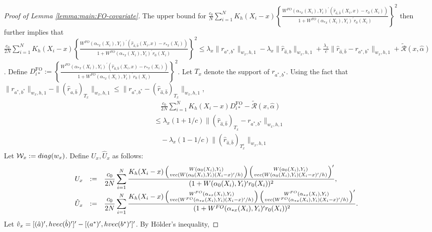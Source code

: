 \documentclass[10pt,a4paper]{amsart}
\begin{document}
\begin{proof}[Proof of Lemma \ref{lemma:main:FO-covariate}]
The upper bound for $\frac{c_0}{N}\sum_{i=1}^NK_h(X_i-x)\left\{\frac{W^{FO}(\alpha_{*x}(X_i),Y_i)^\prime(\hat{r}_{\hat a,\hat b}(X_i,x)-r_0(X_i))}{1+W^{FO}(\alpha_{*x}(X_i),Y_i)^\prime r_0(X_i)}\right\}^2$ then further implies that $\frac{c_0}{2N} \sum_{i=1}^NK_h(X_i-x)\left\{\frac{W^{FO}(\alpha_{*x}(X_i),Y_i)^\prime(\hat{r}_{\hat a, \hat b}(X_i,x)-r_{*x}(X_i))}{1+W^{FO}(\alpha_{*x}(X_i),Y_i)^\prime r_0(X_i)}\right\}^2\leq \lambda_x\|r_{a^*,b^*}\|_{w_x,h,1} -  \lambda_x\|\hat r_{\hat a,\hat b}\|_{w_x,h,1} + \frac{\lambda_x}{c}\|\hat r_{\hat a,\hat b} - r_{a^*,b^*}\|_{w_x,h,1}   + \widetilde{\mathcal{R}}(x,\hat{\alpha})$. Define $\displaystyle D_{i*}^{\mathrm{FO}}:=\left\{\frac{W^{FO}(\alpha_{*x}(X_i),Y_i)^\prime(\hat{r}_{\hat a, \hat b}(X_i,x)-r_{*x}(X_i))}{1+W^{FO}(\alpha_{*x}(X_i),Y_i)^\prime r_0(X_i)}\right\}^2$. Let $T_x$ denote the support of $r_{a^*,b^*}$. Using the fact that $\|r_{a^*,b^*}\|_{w_x,h,1} - \|(\hat r_{\hat a,\hat b})_{T_x}\|_{w_x,h,1}\leq\|r_{a^*,b^*}-(\hat r_{\hat a,\hat b})_{T_x}\|_{w_x,h,1}$, 
\begin{equation}\label{ineq:*:ineq}
\begin{array}{rl}
&\displaystyle\quad\frac{c_0}{2N} \sum_{i=1}^NK_h(X_i-x)D_{i*}^{\mathrm{FO}}-\widetilde{\mathcal{R}}(x,\hat{\alpha})\\ 
&\displaystyle \leq \lambda_x(1+1/c)\|(\hat r_{\hat a,\hat b})_{T_x} - r_{a^*,b^*}\|_{w_x,h,1}\\
&\quad\displaystyle-\lambda_x(1-1/c)\|(\hat r_{\hat a,\hat b})_{T_x^c}\|_{w_x,h,1}
\end{array}
\end{equation}
Let $\mathcal{W}_x:={\rm diag}(w_x)$. Define $U_x,\hat{U}_x$ as follows: 
$$\begin{array}{rcl}
U_x&:=&\displaystyle\frac{c_0}{2N}\sum_{i=1}^N\displaystyle\frac{K_h(X_i-x)\left( {W(\alpha_0(X_i),Y_i)}\atop{ {\rm vec}( W(\alpha_0(X_i),Y_i) (X_i-x)'/h)}\right)\left( {W(\alpha_0(X_i),Y_i)}\atop{ {\rm vec}( W(\alpha_0(X_i),Y_i) (X_i-x)'/h)}\right)'}{(1+W(\alpha_0(X_i),Y_i)^\prime r_0(X_i))^2},\\
\hat{U}_x&:=&\displaystyle\frac{c_0}{2N}\sum_{i=1}^N\frac{K_h(X_i-x)\left( {W^{FO}(\alpha_{*x}(X_i),Y_i)}\atop{ {\rm vec}( W^{FO}(\alpha_{*x}(X_i),Y_i) (X_i-x)'/h)}\right)\left( {W^{FO}(\alpha_{*x}(X_i),Y_i)}\atop{ {\rm vec}( W^{FO}(\alpha_{*x}(X_i),Y_i) (X_i-x)'/h)}\right)'}{(1+W^{FO}(\alpha_{*x}(X_i),Y_i)^\prime r_0(X_i))^2}.
\end{array}$$ 
Let $\hat v_x = [ (\hat a)', h{\rm vec}(\hat b)' ]' - [ (a^{*})', h{\rm vec}(b^*)']'$. By H\"older's inequality, 

\end{proof}
\end{document}
